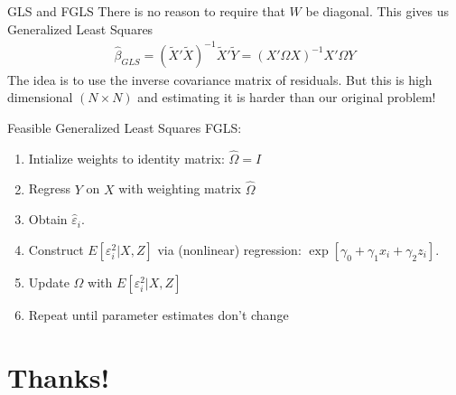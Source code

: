 \documentclass[aspectratio=169]{beamer}
\begin{document}
\begin{frame}{GLS and FGLS}
There is no reason to require that $W$ be diagonal. This gives us \alert{Generalized Least Squares}
\begin{align*}
\widehat{\beta}_{GLS} = (\tilde{X}'\tilde{X})^{-1}\tilde{X}'\tilde{Y} = (X' \Omega  X)^{-1} X' \Omega Y
\end{align*}
The idea is to use the \alert{inverse covariance matrix} of residuals. But this is high dimensional $(N \times N)$ and estimating it is harder than our original problem!

 Feasible Generalized Least Squares \alert{FGLS}:
\begin{enumerate}
\item Intialize weights to identity matrix: $\widehat{\Omega}= I$
\item Regress $Y$ on $X$ with weighting matrix $\widehat{\Omega}$
\item Obtain $\widehat{\varepsilon}_i$.
\item Construct $E[ \varepsilon_i^2 | X, Z]$ via (nonlinear) regression: $\exp[ \gamma_0 + \gamma_1 x_{i} + \gamma_2 z_{i}]$.
\item Update $\widehat{\Omega}$ with $E[ \varepsilon_i^2 | X, Z]$
\item Repeat until parameter estimates don't change
\end{enumerate}
\end{frame}


\section*{Thanks!}
\end{document}
